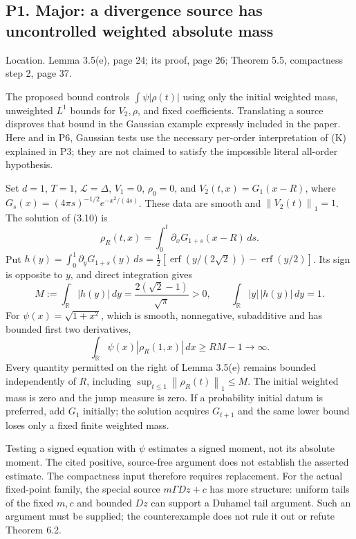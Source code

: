 \documentclass[10pt]{article}
\begin{document}
\subsection*{P1. Major: a divergence source has uncontrolled weighted absolute mass}
Location. Lemma 3.5(e), page 24; its proof, page 26; Theorem 5.5, compactness step 2, page 37.\par
The proposed bound controls \(\int\psi|\rho(t)|\) using only the initial weighted mass, unweighted \(L^1\) bounds for \(V_2,\rho\), and fixed coefficients. Translating a source disproves that bound in the Gaussian example expressly included in the paper. Here and in P6, Gaussian tests use the necessary per-order interpretation of (K) explained in P3; they are not claimed to satisfy the impossible literal all-order hypothesis.\par
Set \(d=1\), \(T=1\), \(\mathcal L=\Delta\), \(V_1=0\), \(\rho_0=0\), and \(V_2(t,x)=G_1(x-R)\), where \(G_s(x)=(4\pi s)^{-1/2}e^{-x^2/(4s)}\). These data are smooth and \(\left\|V_2(t)\right\|_1=1\). The solution of (3.10) is \[\rho_R(t,x)=\int_0^t\partial_xG_{1+s}(x-R)\,ds.\] Put \(h(y)=\int_0^1\partial_yG_{1+s}(y)\,ds
=\tfrac12[\operatorname{erf}(y/(2\sqrt2))
-\operatorname{erf}(y/2)]\). Its sign is opposite to \(y\), and direct integration gives \[M:=\int_\mathbb R|h(y)|\,dy=\frac{2(\sqrt2-1)}{\sqrt\pi}>0,
 \qquad \int_\mathbb R|y|\,|h(y)|\,dy=1 .\] For \(\psi(x)=\sqrt{1+x^2}\), which is smooth, nonnegative, subadditive and has bounded first two derivatives, \[\int_\mathbb R\psi(x)|\rho_R(1,x)|\,dx\ge RM-1\longrightarrow\infty .\] Every quantity permitted on the right of Lemma 3.5(e) remains bounded independently of \(R\), including \(\sup_{t\le1}\left\|\rho_R(t)\right\|_1\le M\). The initial weighted mass is zero and the jump measure is zero. If a probability initial datum is preferred, add \(G_1\) initially; the solution acquires \(G_{t+1}\) and the same lower bound loses only a fixed finite weighted mass.\par
Testing a signed equation with \(\psi\) estimates a signed moment, not its absolute moment. The cited positive, source-free argument does not establish the asserted estimate. The compactness input therefore requires replacement. For the actual fixed-point family, the special source \(m\Gamma Dz+c\) has more structure: uniform tails of the fixed \(m,c\) and bounded \(Dz\) can support a Duhamel tail argument. Such an argument must be supplied; the counterexample does not rule it out or refute Theorem 6.2.\par
\end{document}

